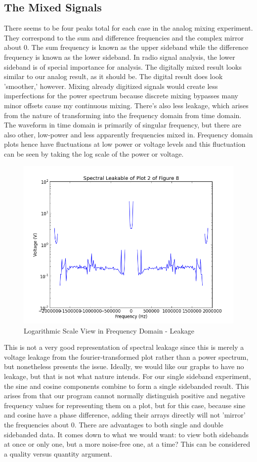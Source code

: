 \documentclass[12pt]{article}
\begin{document}
\subsection{The Mixed Signals}
There seems to be four peaks total for each case in the analog mixing
experiment. They correspond to the sum and difference frequencies and
the complex mirror about 0. The sum frequency is known as the upper
sideband while the difference frequency is known as the lower
sideband. In radio signal analysis, the lower sideband is of special
importance for analysis. The digitally mixed result looks similar to our
analog result, as it should be. The digital result does look 'smoother,'
however. Mixing already digitized signals would create less
imperfections for the power spectrum because discrete mixing bypasses
many minor offsets cause my continuous mixing. There's also less
leakage, which arises from the nature of transforming into the frequency
domain from time domain. The waveform in time domain is primarily of
singular frequency, but there are also other, low-power and less
apparently frequencies mixed in. Frequency domain plots hence have
fluctuations at low power or voltage levels and this fluctuation can be
seen by taking the log scale of the power or voltage. 
\begin{figure}[!h]
\caption{Logarithmic Scale View in Frequency Domain - Leakage}
\centering
\includegraphics[width=.75\textwidth]{leakage.png}\end{figure}
This is not a very good representation of spectral leakage since this is
merely a voltage leakage from the fourier-transformed plot rather than a
power spectrum, but nonetheless presents the issue. Ideally, we would
like our graphs to have no leakage, but that is not what nature intends.
For our single sideband experiment, the sine and cosine components
combine to form a single sidebanded result. This arises from that our
program cannot normally distinguish positive and negative frequency 
values for representing them on a plot, but for this case, because sine 
and cosine have a phase difference, adding their arrays directly will
not 'mirror' the frequencies about 0. There are advantages to both
single and double sidebanded data. It comes down to what we would want:
to view both sidebands at once or only one, but a more noise-free one, 
at a time? This can be considered a quality versus quantity argument.
\end{document}
